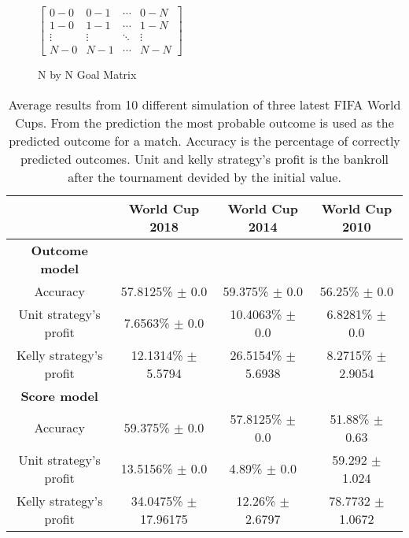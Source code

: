 

\begin{figure}
    $\begin{bmatrix}
    0-0 & 0-1 & \cdots & 0-N \\
    1-0 & 1-1 & \cdots   &1-N \\
    \vdots & \vdots   & \ddots & \vdots \\
    N-0 & N-1 & \cdots & N-N\end{bmatrix}$
\caption{N by N Goal Matrix}
\end{figure}

\begin{sidewaystable}
    \caption{Average results from 10 different simulation of three latest FIFA World Cups. From the prediction the most probable outcome is used as the predicted outcome for a match. Accuracy is the percentage of correctly predicted outcomes. Unit and kelly strategy's profit is the bankroll after the tournament devided by the initial value.}
    \begin{tabular}{ | c |c| c | c |}
    \hline
    & World Cup 2018 & World Cup 2014 & World Cup 2010 \\
    \hline
    \textbf{Outcome model} \\
    \hline
    Accuracy & 57.8125\% $\pm$ 0.0 & 59.375\% $\pm$  0.0 & 56.25\% $\pm$ 0.0 \\
    Unit strategy's profit& 7.6563\% $\pm$ 0.0 & 10.4063\% $\pm$ 0.0 & 6.8281\% $\pm$ 0.0 \\
    Kelly strategy's profit& 12.1314\% $\pm$ 5.5794 & 26.5154\% $\pm$ 5.6938 & 8.2715\% $\pm$ 2.9054 \\
    \hline
    \textbf{Score model} \\
    \hline
    Accuracy & 59.375\% $\pm$ 0.0 & 57.8125\% $\pm$ 0.0 & 51.88\% $\pm$ 0.63 \\
    Unit strategy's profit & 13.5156\% $\pm$ 0.0 & 4.89\%  $\pm$ 0.0 & 59.292 $\pm$ 1.024 \\
    Kelly strategy's profit & 34.0475\% $\pm$ 17.96175 & 12.26\% $\pm$ 2.6797 & 78.7732 $\pm$ 1.0672 \\
    \hline
   \end{tabular}
\end{sidewaystable}

